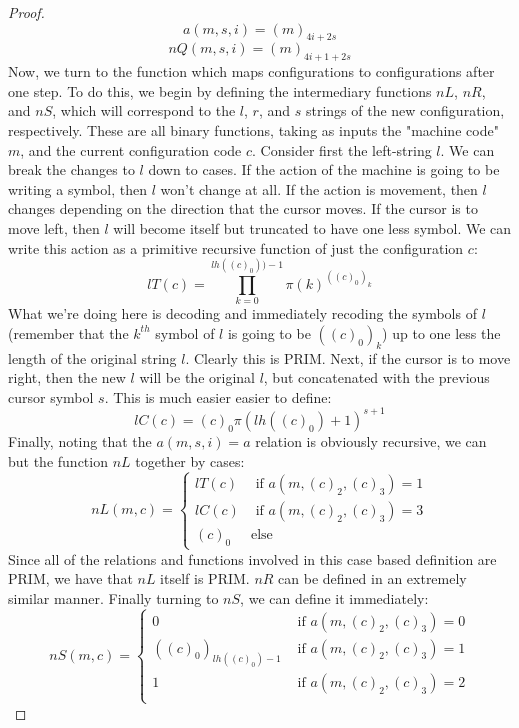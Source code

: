 \documentclass{article}
\theoremstyle{definition}
\theoremstyle{plain}
\theoremstyle{theorem}
\begin{document}
\begin{proof}
    \[ a(m,s,i) = (m)_{4i+ 2s} \]
    \[ nQ(m,s,i) = (m)_{4i+1+2s} \]
    Now, we turn to the function which maps configurations to configurations after one step. To do this, we begin by defining the intermediary functions $nL$, $nR$, and $nS$, which will correspond to the $l$, $r$, and $s$ strings of the new configuration, respectively. These are all binary functions, taking as inputs the "machine code" $m$, and the current configuration code $c$. Consider first the left-string $l$. We can break the changes to $l$ down to cases. If the action of the machine is going to be writing a symbol, then $l$ won't change at all. If the action is movement, then $l$ changes depending on the direction that the cursor moves. If the cursor is to move left, then $l$ will become itself but truncated to have one less symbol. We can write this action as a primitive recursive function of just the configuration $c$:
    \[ lT(c) = \prod_{k=0}^{lh((c)_0))-1}\pi(k)^{((c)_0)_k}\]
    What we're doing here is decoding and immediately recoding the symbols of $l$ (remember that the $k^{th}$ symbol of $l$ is going to be $((c)_0)_k$) up to one less the length of the original string $l$. Clearly this is PRIM. Next, if the cursor is to move right, then the new $l$ will be the original $l$, but concatenated with the previous cursor symbol $s$. This is much easier easier to define:
    \[ lC(c) = (c)_0\pi(lh((c)_0)+1)^{s+1} \]
    Finally, noting that the $a(m,s,i) = a$ relation is obviously recursive, we can but the function $nL$ together by cases:
    \[ nL(m,c) = \begin{cases}
               lT(c) & \textrm{ if $a(m,(c)_2,(c)_3) = 1$} \\
               lC(c) & \textrm{ if $a(m,(c)_2,(c)_3) = 3$} \\
               (c)_0 & \textrm{else}
            \end{cases} \]
    Since all of the relations and functions involved in this case based definition are PRIM, we have that $nL$ itself is PRIM. $nR$ can be defined in an extremely similar manner. Finally turning to $nS$, we can define it immediately:
    \[ nS(m,c) = \begin{cases}
                    0 & \textrm{ if $a(m,(c)_2,(c)_3) = 0$} \\
                    ((c)_0)_{lh((c)_0)-1} & \textrm{ if $a(m,(c)_2,(c)_3) = 1$} \\
                    1 & \textrm{ if $a(m,(c)_2,(c)_3) = 2$} \\

\end{cases}\]
\end{proof}
\end{document}
